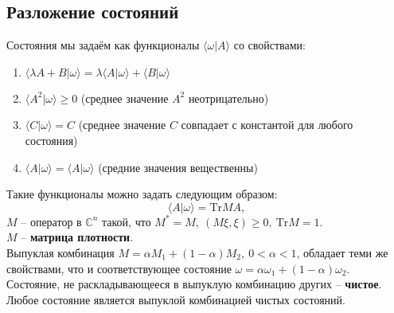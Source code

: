 \subsection*{Разложение состояний}
Состояния мы задаём как функционалы $\langle\omega|A\rangle$ со свойствами:
\begin{enumerate}
	\item $\langle\lambda A + B|\omega\rangle = \lambda\langle A|\omega\rangle + \langle B|\omega\rangle$
	\item $\langle A^2|\omega\rangle \ge 0$ (среднее значение $A^2$ неотрицательно)
	\item $\langle C|\omega\rangle = C$ (среднее значение $C$ совпадает с константой для любого состояния)
	\item $\langle A|\omega\rangle = \langle A|\omega\rangle$ (средние значения вещественны)
\end{enumerate}
Такие функционалы можно задать следующим образом:
$$
	\langle A|\omega\rangle = \text{Tr}MA,
$$
$M$ -- оператор в $\mathbb{C}^n$ такой, что $M^* = M,\ (M\xi,\xi)\ge 0,\ \text{Tr}M = 1$.\\
$M$ -- {\bf матрица плотности}.\\
Выпуклая комбинация $M = \alpha M_1 + (1-\alpha)M_2,\ 0<\alpha<1$, обладает теми же свойствами, что и соответствующее состояние $\omega = \alpha\omega_1 + (1-\alpha)\omega_2$.\\
Состояние, не раскладывающееся в выпуклую комбинацию других -- {\bf чистое}. Любое состояние является выпуклой комбинацией чистых состояний.